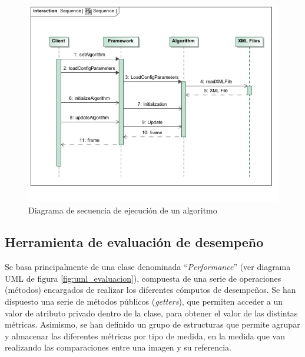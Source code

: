 \begin{figure}[h!]
\centering
\includegraphics[scale=0.5]{img/ch5/Sequence}
\caption[Diagrama de secuencia]{Diagrama de secuencia de ejecución de un algoritmo}
\label{fig:uml_sequence}
\end{figure}


\subsection{Herramienta de evaluación de desempeño}
Se basa principalmente de una clase denominada ``\textit{Performance}'' (ver diagrama UML de figura \ref{fig:uml_evaluacion}), compuesta de una serie de operaciones (métodos) encargados de realizar los diferentes cómputos de desempeños. Se han dispuesto una serie de métodos públicos (\textit{getters}), que permiten acceder a un valor de atributo privado dentro de la clase, para obtener el valor de las distintas métricas. Asimismo, se han definido un grupo de estructuras que permite agrupar y almacenar las diferentes métricas por tipo de medida, en la medida que van realizando las comparaciones entre una imagen y su referencia. 

